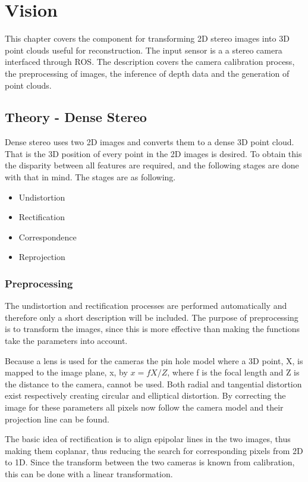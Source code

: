 \chapter{Vision}
This chapter covers the component for transforming 2D stereo images into 3D point clouds useful for reconstruction. The input sensor is a a stereo camera interfaced through ROS. The description covers the camera calibration process, the preprocessing of images, the inference of depth data and the generation of point clouds.

\section{Theory - Dense Stereo}

Dense stereo uses two 2D images and converts them to a dense 3D point cloud. That is the 3D position of every point in the 2D images is desired. To obtain this the disparity between all features are required, and the following stages are done with that in mind. The stages are as following.

\begin{itemize}
  \item Undistortion
  \item Rectification
  \item Correspondence
  \item Reprojection
\end{itemize}


\subsection{Preprocessing}
The undistortion and rectification processes are performed automatically and therefore only a short description will be included. The purpose of preprocessing is to transform the images, since this is more effective than making the functions take the parameters into account.

Because a lens is used for the cameras the pin hole model where a 3D point, X, is mapped to the image plane, x, by $ x = f X/Z $, where f is the focal length and Z is the distance to the camera, cannot be used. Both radial and tangential distortion exist respectively creating circular and elliptical distortion. By correcting the image for these parameters all pixels now follow the camera model and their projection line can be found.

The basic idea of rectification is to align epipolar lines in the two images, thus making them coplanar, thus reducing the search for corresponding pixels from 2D to 1D. Since the transform between the two cameras is known from calibration, this can be done with a linear transformation.

